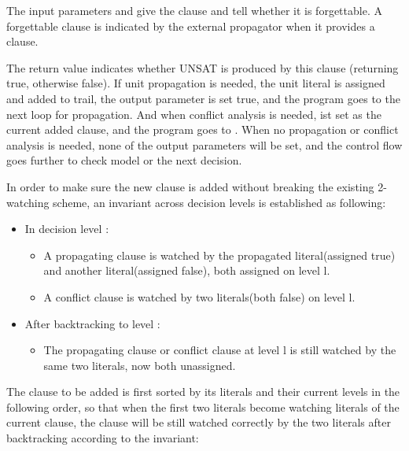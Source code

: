 The input parameters  and  give the clause and tell whether it is forgettable. A forgettable clause is indicated by the external propagator when it provides a clause.

The return value  indicates whether UNSAT is produced by this clause (returning true, otherwise false). If unit propagation is needed, the unit literal is assigned and added to trail, the output parameter  is set true, and the program goes to the next loop for propagation. And when conflict analysis is needed,  ist set as the current added clause, and the program goes to . When no propagation or conflict analysis is needed, none of the output parameters will be set, and the control flow goes further to check model or the next decision.



In order to make sure the new clause is added without breaking the existing 2-watching scheme, an invariant across decision levels is established as following:

\begin{itemize}
  \item In decision level :
  \begin{itemize}
    \item A propagating clause is watched by the propagated literal(assigned true) and another literal(assigned false), both assigned on level l.
    \item A conflict clause is watched by two literals(both false) on level l.
  \end{itemize}
  \item After backtracking to level :
  \begin{itemize}
    \item The propagating clause or conflict clause at level l is still watched by the same two literals, now both unassigned.
  \end{itemize}
\end{itemize}


The clause to be added is first sorted by its literals and their current levels in the following order, so that when the first two literals become watching literals of the current clause, the clause will be still watched correctly by the two literals after backtracking according to the invariant:

